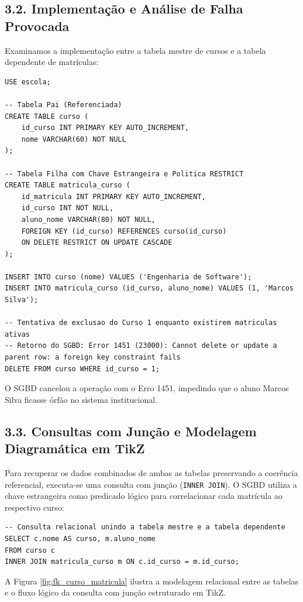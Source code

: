 \subsection*{3.2. Implementação e Análise de Falha Provocada}

Examinamos a implementação entre a tabela mestre de cursos e a tabela dependente de matrículas:

\begin{lstlisting}
USE escola;

-- Tabela Pai (Referenciada)
CREATE TABLE curso (
    id_curso INT PRIMARY KEY AUTO_INCREMENT,
    nome VARCHAR(60) NOT NULL
);

-- Tabela Filha com Chave Estrangeira e Politica RESTRICT
CREATE TABLE matricula_curso (
    id_matricula INT PRIMARY KEY AUTO_INCREMENT,
    id_curso INT NOT NULL,
    aluno_nome VARCHAR(80) NOT NULL,
    FOREIGN KEY (id_curso) REFERENCES curso(id_curso)
    ON DELETE RESTRICT ON UPDATE CASCADE
);

INSERT INTO curso (nome) VALUES ('Engenharia de Software');
INSERT INTO matricula_curso (id_curso, aluno_nome) VALUES (1, 'Marcos Silva');

-- Tentativa de exclusao do Curso 1 enquanto existirem matriculas ativas
-- Retorno do SGBD: Error 1451 (23000): Cannot delete or update a parent row: a foreign key constraint fails
DELETE FROM curso WHERE id_curso = 1;
\end{lstlisting}

O SGBD cancelou a operação com o Erro 1451, impedindo que o aluno Marcos Silva ficasse órfão no sistema institucional.

\subsection*{3.3. Consultas com Junção e Modelagem Diagramática em TikZ}

Para recuperar os dados combinados de ambas as tabelas preservando a coerência referencial, executa-se uma consulta com junção (\texttt{INNER JOIN}). O SGBD utiliza a chave estrangeira como predicado lógico para correlacionar cada matrícula ao respectivo curso:

\begin{lstlisting}
-- Consulta relacional unindo a tabela mestre e a tabela dependente
SELECT c.nome AS curso, m.aluno_nome
FROM curso c
INNER JOIN matricula_curso m ON c.id_curso = m.id_curso;
\end{lstlisting}

A Figura \ref{fig:fk_curso_matricula} ilustra a modelagem relacional entre as tabelas e o fluxo lógico da consulta com junção estruturado em TikZ.

